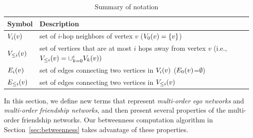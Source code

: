 \begin{table}[t]
\captionsetup[subfigure]{aboveskip=-2pt, belowskip=-1pt}
\center
\caption{Summary of notation}\label{table:symbols}
\small
    \begin{tabular}{| p{1.2cm} | p{10cm} |}
        \hline
        Symbol & Description \\
        \hline
        \hline
        $\V{v}{i}$ & set of $i$-hop neighbors of vertex $v$ ($\V{v}{0} = \{ v \}$)\\
        $\LV{v}{i}$ & set of vertices that are at most $i$ hops away from vertex $v$ (i.e., $\LV{v}{i} = \cup_{k = 0}^{i} \V{v}{k}) $\\
        $\E{v}{i}$ & set of edges connecting two vertices in $\V{v}{i}$ ($\E{v}{0}$=$\emptyset$)\\
        $\LE{v}{i}$ & set of edges connecting two vertices in $\LV{v}{i}$\\
        \hline
    \end{tabular}
\end{table}
In this section, we define new terms that represent {\it multi-order ego networks} and {\it multi-order
friendship networks}, and then present several properties of the multi-order friendship networks.
Our betweenness computation algorithm in Section~\ref{sec:betweenness} takes advantage of these properties.

